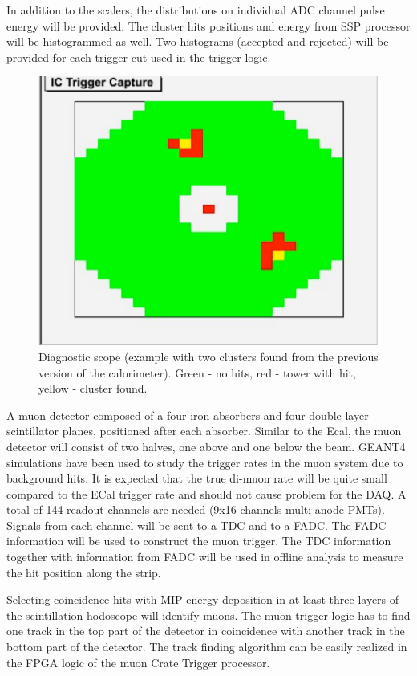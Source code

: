 In addition to the scalers, the distributions on individual ADC channel pulse energy will be provided.
The cluster hits positions and energy from SSP processor will be histogrammed as well. Two histograms (accepted and rejected) will be provided for each trigger cut used in the trigger logic.



\begin{figure}[t]
\includegraphics[scale=0.8]{daq_trigger/figures/dvcs_2_cluster}
\caption{\small{Diagnostic scope (example with two clusters found from the previous version of the calorimeter). Green - no hits, red - tower with hit, yellow - cluster found.}}
\label{fig:dvcs_2_cluster}
\end{figure}







A muon detector composed of a four iron absorbers  and four double-layer scintillator planes, positioned after each absorber. Similar to the Ecal, the muon detector will consist of two halves, one above and one below the beam.
GEANT4 simulations have been used to study the trigger rates in the muon system due to background hits. It is expected that the true di-muon rate will be quite small compared to the ECal trigger rate and should not cause problem for the DAQ. 
A total of 144 readout channels are needed (9x16 channels multi-anode PMTs). Signals from each channel will be sent to a TDC and to a FADC. The FADC information will be used to construct the muon trigger. The TDC information together with information from FADC will be used in offline analysis to measure the hit position along the strip.

Selecting coincidence hits with MIP energy deposition in at least three layers of the scintillation hodoscope will identify muons. 
The muon trigger logic has to find one track in the top part of the detector in coincidence with another track in the bottom part of the detector. The track finding algorithm can be easily realized in the FPGA logic of the muon Crate Trigger processor.

